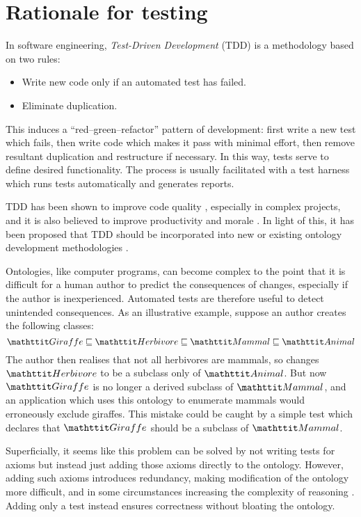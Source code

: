 \documentclass[paper.tex]{subfiles}
\begin{document}
\section{Rationale for testing}
\label{sec:rationale}

In software engineering, \emph{Test-Driven Development} (TDD) \cite{Beck:TDD} is a methodology based on two rules:
\begin{itemize}[nosep]
  \item Write new code only if an automated test has failed.
  \item Eliminate duplication.
\end{itemize}
This induces a ``red--green--refactor'' pattern of development: first write a new test which fails, then write code which makes it pass with minimal effort, then remove resultant duplication and restructure if necessary.
In this way, tests serve to define desired functionality.
The process is usually facilitated with a test harness which runs tests automatically and generates reports.

TDD has been shown to improve code quality \cite{Rafique:TDD}, especially in complex projects, and it is also believed to improve productivity and morale \cite{Beck:TDD}.
In light of this, it has been proposed that TDD should be incorporated into new or existing ontology development methodologies \cite{Keet:TDDOntologies}.


Ontologies, like computer programs, can become complex to the point that it is difficult for a human author to predict the consequences of changes, especially if the author is inexperienced.
Automated tests are therefore useful to detect unintended consequences.
As an illustrative example, suppose an author creates the following classes:
\[ \oent{Giraffe} \sqsubseteq \oent{Herbivore} \sqsubseteq \oent{Mammal} \sqsubseteq \oent{Animal} \]
The author then realises that not all herbivores are mammals, so changes $\oent{Herbivore}$ to be a subclass only of $\oent{Animal}$.
But now $\oent{Giraffe}$ is no longer a derived subclass of $\oent{Mammal}$, and an application which uses this ontology to enumerate mammals would erroneously exclude giraffes.
This mistake could be caught by a simple test which declares that $\oent{Giraffe}$ should be a subclass of $\oent{Mammal}$.

Superficially, it seems like this problem can be solved by not writing tests for axioms but instead just adding those axioms directly to the ontology.
However, adding such axioms introduces redundancy, making modification of the ontology more difficult, and in some circumstances increasing the complexity of reasoning \cite{Vrandecic:UnitTestsOntologies}.
Adding only a test instead ensures correctness without bloating the ontology.
\end{document}
